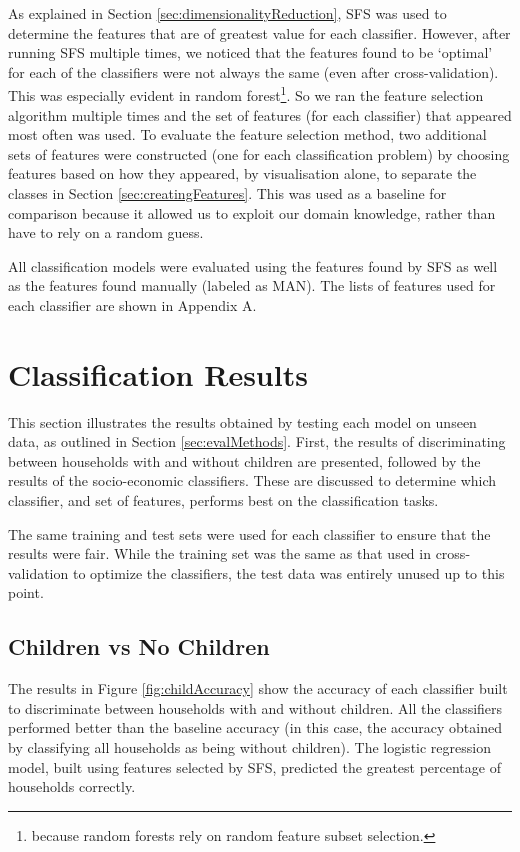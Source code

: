 As explained in Section \ref{sec:dimensionalityReduction}, SFS was used to determine the features that are of greatest value for each classifier. However, after running SFS multiple times, we noticed that the features found to be `optimal' for each of the classifiers were not always the same (even after cross-validation). This was especially evident in random forest\footnote{because random forests rely on random feature subset selection.}.  So we ran the feature selection algorithm multiple times and the set of features (for each classifier) that appeared most often was used. To evaluate the feature selection method, two additional sets of features were constructed (one for each classification problem) by choosing features based on how they appeared, by visualisation alone, to separate the classes in Section \ref{sec:creatingFeatures}. This was used as a baseline for comparison because it allowed us to exploit our domain knowledge, rather than have to rely on a random guess.  

All classification models were evaluated using the features found by SFS as well as the features found manually (labeled as MAN). The lists of features used for each classifier are shown in Appendix A. 


\section{Classification Results}

This section illustrates the results obtained by testing each model on unseen data, as outlined in Section \ref{sec:evalMethods}. First, the results of discriminating between households with and without children are presented, followed by the results of the socio-economic classifiers. These are discussed to determine which classifier, and set of features, performs best on the classification tasks.

The same training and test sets were used for each classifier to ensure that the results were fair. While the training set was the same as that used in cross-validation to optimize the classifiers, the test data was entirely unused up to this point.

\subsection{Children vs No Children}

\childConf
\childAccuracy

The results in Figure \ref{fig:childAccuracy} show the accuracy of each classifier built to discriminate between households with and without children. All the classifiers performed better than the baseline accuracy (in this case, the accuracy obtained by classifying all households as being without children). The logistic regression model, built using features selected by SFS, predicted the greatest percentage of households correctly. 

